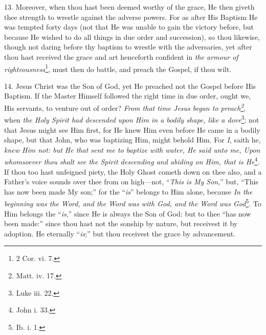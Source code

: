 13. Moreover, when thou hast been deemed worthy of the grace, He then giveth thee strength to wrestle against the adverse powers. For as after His Baptism He was tempted forty days (not that He was unable to gain the victory before, but because He wished to do all things in due order and succession), so thou likewise, though not daring before thy baptism to wrestle with the adversaries, yet after thou hast received the grace and art henceforth confident in \emph{the armour of righteousness}\footnote{2 Cor. vi. 7.}, must then do battle, and preach the Gospel, if thou wilt.

14. Jesus Christ was the Son of God, yet He preached not the Gospel before His Baptism. If the Master Himself followed the right time in due order, ought we, His servants, to venture out of order? \emph{From that time Jesus began to preach\footnote{Matt. iv. 17.}}, when \emph{the Holy Spirit had descended upon Him in a bodily shape, like a dove}\footnote{Luke iii. 22.}; not that Jesus might see Him first, for He knew Him even before He came in a bodily shape, but that John, who was baptizing Him, might behold Him. For \emph{I}, saith he, \emph{knew Him not: but He that sent me to baptize with water, He said unto me, Upon whomsoever thou shalt see the Spirit descending and abiding on Him, that is He}\footnote{John i. 33.}. If thou too hast unfeigned piety, the Holy Ghost cometh down on thee also, and a Father’s voice sounds over thee from on high—not, “\emph{This is My Son},” but, “This has now been made My son;” for the “\emph{is}” belongs to Him alone, because \emph{In the beginning was the Word, and the Word was with God, and the Word was God}\footnote{Ib. i. 1.}. To Him belongs the “\emph{is},” since He is always the Son of God: but to thee “has now been made:” since thou hast not the sonship by nature, but receivest it by adoption. He eternally “\emph{is};” but thou receivest the grace by advancement.

